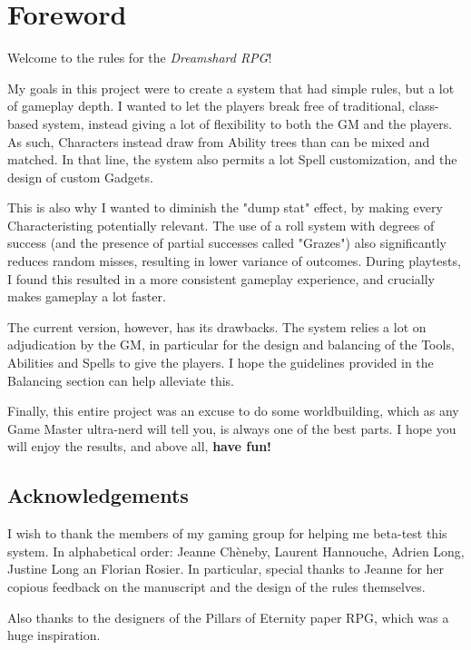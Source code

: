 \chapter*{Foreword}

Welcome to the rules for the \textit{Dreamshard RPG}!

My goals in this project were to create a system that had simple rules, but a lot of gameplay depth. I wanted to let the players break free of traditional, class-based system, instead giving a lot of flexibility to both the GM and the players. As such, Characters instead draw from Ability trees than can be mixed and matched. In that line, the system also permits a lot Spell customization, and the design of custom Gadgets. 

This is also why I wanted to diminish the "dump stat" effect, by making every Characteristing potentially relevant. The use of a roll system with degrees of success (and the presence of partial successes called "Grazes") also significantly reduces random misses, resulting in lower variance of outcomes. During playtests, I found this resulted in a more consistent gameplay experience, and crucially makes gameplay a lot faster.

The current version, however, has its drawbacks. The system relies a lot on adjudication by the GM, in particular for the design and balancing of the Tools, Abilities and Spells to give the players. I hope the guidelines provided in the Balancing section can help alleviate this.

Finally, this entire project was an excuse to do some worldbuilding, which as any Game Master ultra-nerd will tell you, is always one of the best parts. I hope you will enjoy the results, and above all, \textbf{have fun!}



\section*{Acknowledgements}

I wish to thank the members of my gaming group for helping me beta-test this system. In alphabetical order: Jeanne Chèneby, Laurent Hannouche, Adrien Long, Justine Long an Florian Rosier. In particular, special thanks to Jeanne for her copious feedback on the manuscript and the design of the rules themselves.

Also thanks to the designers of the Pillars of Eternity paper RPG, which was a huge inspiration.

